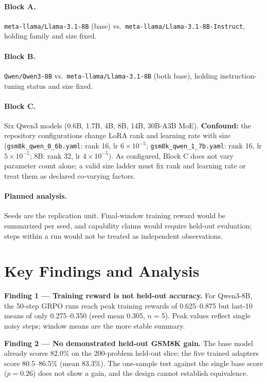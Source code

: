 \documentclass[12pt,a4paper]{report}
\theoremstyle{definition}
\begin{document}
\paragraph{Block A.} \texttt{meta-llama/Llama-3.1-8B} (base) vs.\ \texttt{meta-llama/Llama-3.1-8B-Instruct}, holding family and size fixed.

\paragraph{Block B.} \texttt{Qwen/Qwen3-8B} vs.\ \texttt{meta-llama/Llama-3.1-8B} (both base), holding instruction-tuning status and size fixed.

\paragraph{Block C.} Six Qwen3 models (0.6B, 1.7B, 4B, 8B, 14B, 30B-A3B MoE). \textbf{Confound:} the repository configurations change LoRA rank and learning rate with size (\texttt{gsm8k\_qwen\_0\_6b.yaml}: rank 16, lr $6\times10^{-5}$; \texttt{gsm8k\_qwen\_1\_7b.yaml}: rank 16, lr $5\times10^{-5}$; 8B: rank 32, lr $4\times10^{-5}$). As configured, Block C does not vary parameter count alone; a valid size ladder must fix rank and learning rate or treat them as declared co-varying factors.

\paragraph{Planned analysis.} Seeds are the replication unit. Final-window training reward would be summarized per seed, and capability claims would require held-out evaluation; steps within a run would not be treated as independent observations.

\section{Key Findings and Analysis}
\label{sec:key_findings}

\textbf{Finding 1 --- Training reward is not held-out accuracy.}
For Qwen3-8B, the 50-step GRPO runs reach peak training rewards of 0.625--0.875 but last-10 means of only 0.275--0.350 (seed mean 0.305, $n=5$). Peak values reflect single noisy steps; window means are the more stable summary.

\textbf{Finding 2 --- No demonstrated held-out GSM8K gain.}
The base model already scores 82.0\% on the 200-problem held-out slice; the five trained adapters score 80.5--86.5\% (mean 83.3\%). The one-sample test against the single base score ($p=0.26$) does not show a gain, and the design cannot establish equivalence.
\end{document}
